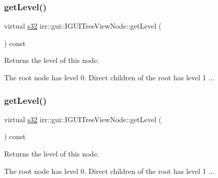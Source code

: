\subsubsection{\texorpdfstring{get\+Level()}{getLevel()}\hspace{0.1cm}{\footnotesize\ttfamily [1/2]}}
{\footnotesize\ttfamily virtual \hyperlink{namespaceirr_ac66849b7a6ed16e30ebede579f9b47c6}{s32} irr\+::gui\+::\+I\+G\+U\+I\+Tree\+View\+Node\+::get\+Level (\begin{DoxyParamCaption}{ }\end{DoxyParamCaption}) const\hspace{0.3cm}{\ttfamily [pure virtual]}}



Returns the level of this node. 

The root node has level 0. Direct children of the root has level 1 ... \mbox{\label{classirr_1_1gui_1_1IGUITreeViewNode_aa57cadea8ba12bb3533ecf2845cd7971}} 
\subsubsection{\texorpdfstring{get\+Level()}{getLevel()}\hspace{0.1cm}{\footnotesize\ttfamily [2/2]}}
{\footnotesize\ttfamily virtual \hyperlink{namespaceirr_ac66849b7a6ed16e30ebede579f9b47c6}{s32} irr\+::gui\+::\+I\+G\+U\+I\+Tree\+View\+Node\+::get\+Level (\begin{DoxyParamCaption}{ }\end{DoxyParamCaption}) const\hspace{0.3cm}{\ttfamily [pure virtual]}}



Returns the level of this node. 

The root node has level 0. Direct children of the root has level 1 ... \mbox{\label{classirr_1_1gui_1_1IGUITreeViewNode_a5f54e1386055ad0b45775ebefb1b5600}} 
